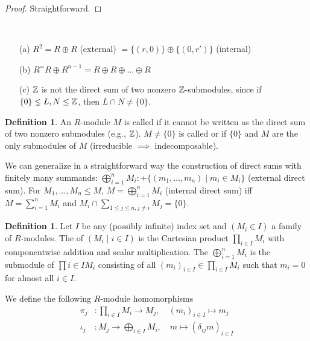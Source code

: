 \documentclass[11pt]{book}
\theoremstyle{definition}   \newtheorem{defn}[counter]{Definition} %
\DeclareMathOperator{\ra}{\rightarrow}   \DeclareMathOperator{\Poly}{\mathbf{P}}   \DeclareMathOperator{\spn}{\textnormal{span}}   \DeclareMathOperator{\aut}{\textnormal{Aut}}
\newcommand{\vs}{\vspace{8pt}}
\numberwithin{counter}{chapter}
\begin{document}
\begin{proof}
Straightforward.
\end{proof}

\vs

\begin{example*}\
\begin{enumerate}
\item[(a)] $R^2 = R \oplus R$ (external)  $= \{(r,0)\} \oplus \{(0,r')\}$ (internal)
\item[(b)] $R^ = R \oplus R^{n-1} = R \oplus R \oplus \dots \oplus R$
\item[(c)] $\operatorname{\mathbb{Z}}$ is not the direct sum of two nonzero $\operatorname{\mathbb{Z}}$-submodules, since if $\{0\} \lneq L,N \leq \operatorname{\mathbb{Z}}$, then $L \cap N \ne \{0\}$.
\end{enumerate}
\end{example*}

\vs

\begin{defn}
An $R$-module $M$ is called  if it cannot be written as the direct sum of two nonzero submodules (e.g., $\operatorname{\mathbb{Z}}$). $M \ne \{0\}$ is called  or  if $\{0\}$ and $M$ are the only submodules of $M$ (irreducible $\implies$ indecomposable).
\end{defn}

\vs

We can generalize in a straightforward way the construction of direct sums with finitely many summands: $\bigoplus_{i=1}^n M_i :+ \{(m_1,\dots,m_n) \mid m_i \in M_i\}$ (external direct sum). For $M_1,\dots,M_n \leq M$, $M = \bigoplus_{i=1}^n M_i$ (internal direct sum) iff $M = \sum_{i=1}^n M_i$ and $M_i \cap \sum_{1 \leq j \leq n, j \ne i} M_j = \{0\}$.

\vs

\begin{defn}
Let $I$ be any (possibly infinite) index set and $(M_i \in I)$ a family of $R$-modules. The  of $(M_i \mid i \in I)$ is the Cartesian product $\prod_{i \in I} M_i$ with componentwise addition and scalar multiplication. The  $\bigoplus_{i=1}^n M_i$ is the submodule of $\prod{i \in I} M_i$ consisting of all $(m_i)_{i \in I} \in \prod_{i \in I} M_i$ such that $m_i = 0$ for almost all $i \in I$.
\end{defn}

\vs

We define the following $R$-module homomorphisms
\begin{align*}
\pi_j & : \prod_{i \in I} M_i \ra M_j, \quad (m_i)_{i \in I} \mapsto m_j \\
\iota_j &: M_j \ra \bigoplus_{i \in I} M_i,  \quad m \mapsto (\delta_{ij}m)_{i \in I}
\end{align*}
\end{document}
